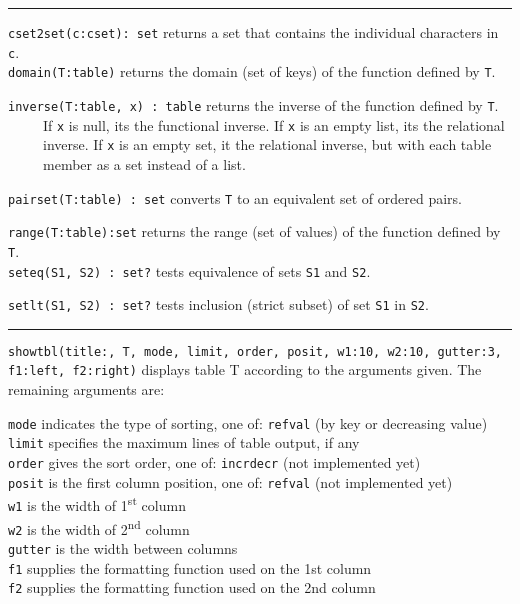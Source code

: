 \vspace{0.25cm}\hrule{}

\texttt{cset2set(c:cset): set} returns a set that contains the
individual characters in \texttt{c}.\\
\texttt{domain(T:table)} returns the domain (set of keys) of the
function defined by \texttt{T}.

\texttt{inverse(T:table, x) : table} returns the inverse of the function
defined by \texttt{T}.\\
 \ \ \ \ \ If \texttt{x} is null, it{\textquotesingle}s the functional
inverse. If \texttt{x} is an empty list, it{\textquotesingle}s the
relational\\
 \ \ \ \ \ inverse. If \texttt{x} is an empty set, it the relational inverse, but
with each table\\
 \ \ \ \ \ member as a set instead of a list.

\texttt{pairset(T:table) : set} converts \texttt{T} to an equivalent set
of ordered pairs.

\texttt{range(T:table):set} returns the range (set of values) of the
function defined by \texttt{T}.\\
\texttt{seteq(S1, S2) : set?} tests equivalence
of sets \texttt{S1} and \texttt{S2}.

\texttt{setlt(S1, S2) : set?} tests inclusion (strict subset) of set
\texttt{S1} in \texttt{S2}. 


\vspace{0.25cm}\hrule{}

\texttt{showtbl(title:{\textquotedbl}{\textquotedbl}, T, mode, limit,
order, posit, w1:10, w2:10, gutter:3, f1:left, f2:right)} displays
table T according to the arguments given. The remaining arguments are:

\texttt{mode} indicates the type of sorting, one of:
\texttt{{\textquotedbl}ref{\textquotedbl}{\textbar}{\textquotedbl}val{\textquotedbl}}
(by key or decreasing value)\\
\texttt{limit} specifies the maximum lines of table output, if
any\\
\texttt{order} gives the sort order, one of:
\texttt{{\textquotedbl}incr{\textquotedbl}{\textbar}{\textquotedbl}decr{\textquotedbl}}
(not implemented yet)\\
\texttt{posit} is the first column position, one of:
\texttt{{\textquotedbl}ref{\textquotedbl}{\textbar}{\textquotedbl}val{\textquotedbl}}
(not implemented yet)\\
\texttt{w1} is the width of 1\textsuperscript{st} column\\
\texttt{w2} is the width of 2\textsuperscript{nd} column\\
\texttt{gutter} is the width between columns\\
\texttt{f1} supplies the formatting function used on the 1st
column\\
\texttt{f2} supplies the formatting function used on the 2nd column

